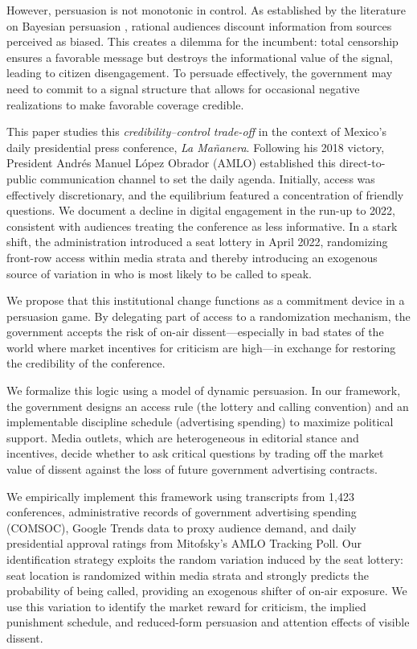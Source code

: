 \documentclass[12pt]{article}
\begin{document}
However, persuasion is not monotonic in control. As established by the literature on Bayesian persuasion \citep{MediaBias-Gentzkow-JPE, PersuasionEmpirical-Dellavigna-AR}, rational audiences discount information from sources perceived as biased. This creates a dilemma for the incumbent: total censorship ensures a favorable message but destroys the informational value of the signal, leading to citizen disengagement. To persuade effectively, the government may need to commit to a signal structure that allows for occasional negative realizations to make favorable coverage credible.

This paper studies this \textit{credibility--control trade-off} in the context of Mexico's daily presidential press conference, \textit{La Mañanera}. Following his 2018 victory, President Andrés Manuel López Obrador (AMLO) established this direct-to-public communication channel to set the daily agenda. Initially, access was effectively discretionary, and the equilibrium featured a concentration of friendly questions. We document a decline in digital engagement in the run-up to 2022, consistent with audiences treating the conference as less informative. In a stark shift, the administration introduced a seat lottery in April 2022, randomizing front-row access within media strata and thereby introducing an exogenous source of variation in who is most likely to be called to speak.

We propose that this institutional change functions as a commitment device in a persuasion game. By delegating part of access to a randomization mechanism, the government accepts the risk of on-air dissent---especially in bad states of the world where market incentives for criticism are high---in exchange for restoring the credibility of the conference.

We formalize this logic using a model of dynamic persuasion. In our framework, the government designs an access rule (the lottery and calling convention) and an implementable discipline schedule (advertising spending) to maximize political support. Media outlets, which are heterogeneous in editorial stance and incentives, decide whether to ask critical questions by trading off the market value of dissent against the loss of future government advertising contracts.

We empirically implement this framework using transcripts from 1,423 conferences, administrative records of government advertising spending (COMSOC), Google Trends data to proxy audience demand, and daily presidential approval ratings from Mitofsky's AMLO Tracking Poll. Our identification strategy exploits the random variation induced by the seat lottery: seat location is randomized within media strata and strongly predicts the probability of being called, providing an exogenous shifter of on-air exposure. We use this variation to identify the market reward for criticism, the implied punishment schedule, and reduced-form persuasion and attention effects of visible dissent.
\end{document}
